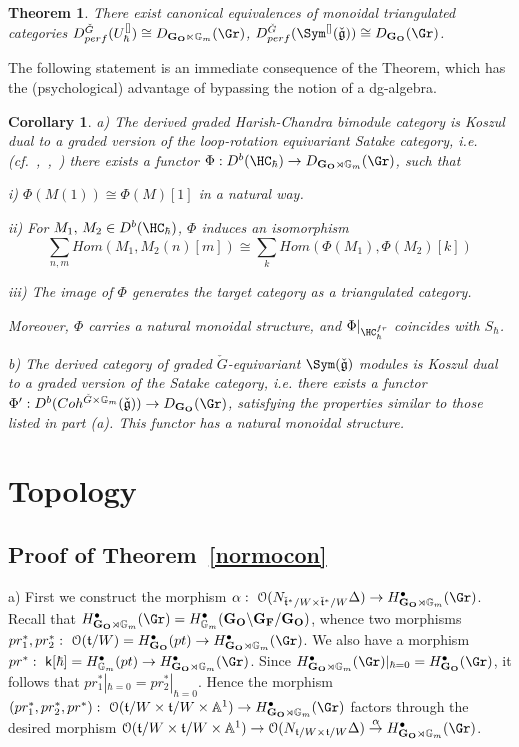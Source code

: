 \documentclass[11pt]{amsart}
\newtheorem{cor}{Corollary}
\newtheorem{thm}{Theorem}
\theoremstyle{definition}
\theoremstyle{remark}
\renewcommand{\O}{{\mathcal O}}
\theoremstyle{remark}
\newcommand{\cal}{\mathcal}
\newcommand{\<}{\langle}
\renewcommand{\>}{\rangle}
\newcommand{\suml}{\sum\limits}
\renewcommand{\t}{{\frak t}}
\newcommand{\Lg}{\check{\mathfrak g}{}}
\newcommand{\Lt}{\check{\mathfrak t}{}}
\newcommand{\LG}{{\check{G}}}
\renewcommand{\O}{{\cal O}}
\newcommand{\GO}{{\bf G_O}}
\newcommand{\GF}{{\bf G_F}}
\newcommand{\Aone}{{\mathbb A}^1}
\newcommand{\Gm}{{{\mathbb G}_m}}
\newcommand{\kk}{\mathsf k}
\newcommand{\Dsym}{{\Sym^{[]}(\Lg)}}
\newcommand{\Duh}{{U_\hbar^{[]}}}
\begin{document}
\begin{thm}\label{polkovnik}
There exist canonical equivalences of monoidal triangulated categories
$D^{\LG}_{perf}(\Duh) \cong D_{\GO\ltimes \Gm}(\Gr)$,
$D^{\LG}_{perf}(\Dsym) \cong D_{\GO}(\Gr)$.

\end{thm}

The following statement is an immediate consequence of the Theorem,
which has the (psychological) advantage  of bypassing 
the notion of a dg-algebra.

\begin{cor}
\label{bone}
a) The derived
graded Harish-Chandra bimodule category is
Koszul dual to a graded version of the 
loop-rotation equivariant Satake category,
i.e. (cf.~\cite{BGS},~\cite{ABG},~\cite{Hu}) there exists a functor 
$\Phi:D^b(\HC_\hbar) \to D_{\GO\rtimes \Gm}(\Gr)$, such that 

i) $\Phi(M(1)) \cong \Phi(M)[1]$ in a natural way.

ii) For $M_1,\, M_2 \in D^b(\HC_\hbar)$, $\Phi$ induces an isomorphism
$$\suml_{n,m}Hom(M_1, M_2(n)[m])\cong \suml_k Hom(\Phi(M_1),\Phi(M_2)[k])$$

iii)
The image of $\Phi$ generates the target category as a triangulated 
category.

Moreover, $\Phi$ carries a natural monoidal structure, and  
$\Phi|_{\HC_\hbar^{fr}}$ coincides with $S_\hbar$.

b) The derived category of graded $\LG$-equivariant $\Sym(\Lg)$
modules is 
Koszul dual to a graded version of the  Satake category,
i.e. there exists a functor 
$\Phi':D^b(Coh^{\LG\times \Gm}(\Lg) ) \to D_{\GO}(\Gr)$, 
satisfying the properties similar to those listed in part (a).
This functor has a natural monoidal structure.
\end{cor}








\section{Topology}


\subsection{Proof of Theorem~\ref{normocon}}
a) First we construct the morphism $\alpha:\
\O(N_{\Lt^*/W\times \Lt^*/W}\Delta)\to H^\bullet_{\GO \rtimes \Gm}(\Gr)$.
Recall that $H^\bullet_{\GO\rtimes\Gm}(\Gr)=
H^\bullet_{\Gm}(\GO\backslash\GF/\GO)$,
whence two morphisms $pr_1^*, pr_2^*:\ \O(\t/W)=H^\bullet_\GO(pt)\to
H^\bullet_{\GO \rtimes \Gm}(\Gr)$.
We also have a morphism $pr^*:\ \kk[\hbar]=H^\bullet_\Gm(pt)\to
H^\bullet_{\GO \rtimes \Gm}(\Gr)$. Since 
$H^\bullet_{\GO \rtimes \Gm}(\Gr)|_{\hbar=0}=
H^\bullet_\GO(\Gr)$, it follows that $pr_1^*|_{\hbar=0}=pr_2^*|_{\hbar=0}$.
Hence the morphism $(pr_1^*,pr_2^*,pr^*):\ \O(\t/W\times\t/W\times\Aone)\to
H^\bullet_{\GO \rtimes \Gm}(\Gr)$ factors through the desired morphism
$\O(\t/W\times\t/W\times\Aone)\to
\O(N_{\t/W\times \t/W}\Delta)\overset{\alpha}{\to} 
H^\bullet_{\GO \rtimes \Gm}(\Gr)$.
\end{document}
